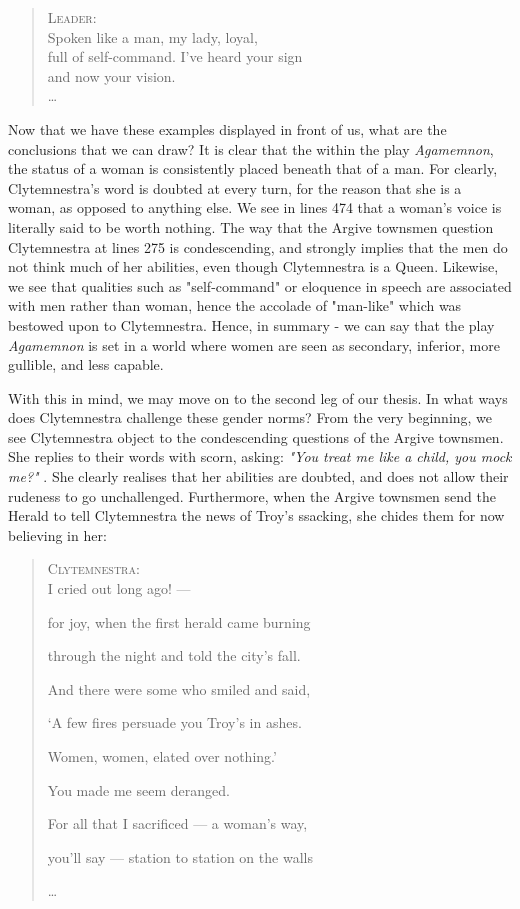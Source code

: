 \begin{quote}
  \textsc{Leader}: \\
  Spoken like a man, my lady, loyal, \\
  full of self-command. I've heard your sign \\
  and now your vision. \\
  \ldots\

  \autocite[355]{fagles}
\end{quote}

Now that we have these examples displayed in front of us, what are the
conclusions that we can draw? It is clear that the within the play
\emph{Agamemnon}, the status of a woman is consistently placed beneath that of a
man. For clearly, Clytemnestra's word is doubted at every turn, for the reason
that she is a woman, as opposed to anything else. We see in lines 474 that a
woman's voice is literally said to be worth nothing. The way that the Argive
townsmen question Clytemnestra at lines 275 is condescending, and strongly
implies that the men do not think much of her abilities, even though
Clytemnestra is a Queen. Likewise, we see that qualities such as "self-command"
or eloquence in speech are associated with men rather than woman, hence the
accolade of "man-like" which was bestowed upon to Clytemnestra. Hence, in
summary - we can say that the play \emph{Agamemnon} is set in a world where
women are seen as secondary, inferior, more gullible, and less capable.

With this in mind, we may move on to the second leg of our thesis. In what ways
does Clytemnestra challenge these gender norms? From the very beginning, we see
Clytemnestra object to the condescending questions of the Argive townsmen. She
replies to their words with scorn, asking: \emph{"You treat me like a child,
you mock me?"} \autocite[275]{fagles}. She clearly realises that her abilities
are doubted, and does not allow their rudeness to go unchallenged. Furthermore,
when the Argive townsmen send the Herald to tell Clytemnestra the news of Troy's
ssacking, she chides them for now believing in her:

\begin{quote}
  \textsc{Clytemnestra}: \\
  I cried out long ago! ---

  for joy, when the first herald came burning

  through the night and told the city's fall.

  And there were some who smiled and said,

  `A few fires persuade you Troy's in ashes.

  Women, women, elated over nothing.'

  You made me seem deranged.

  For all that I sacrificed --- a woman's way,

  you'll say --- station to station on the walls

  \ldots\

  \autocite[580]{fagles}
\end{quote}

